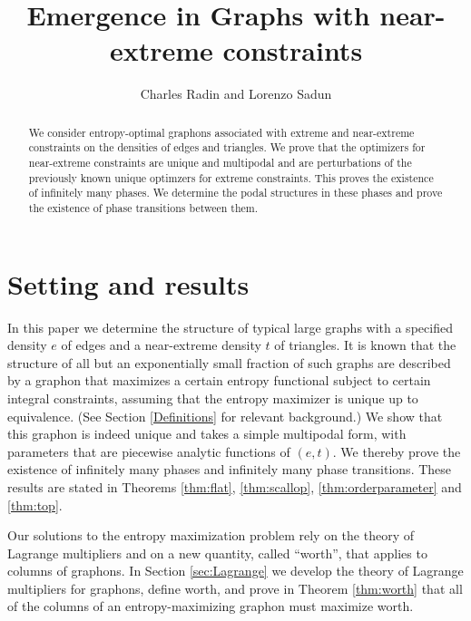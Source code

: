 \documentclass[12pt]{amsart}
\title{Emergence in Graphs with near-extreme constraints}
\author{Charles Radin and Lorenzo Sadun}
\newcommand{\Value}{worth}
\begin{document}
\begin{abstract} 
We consider entropy-optimal graphons associated with extreme and near-extreme constraints on the densities of edges and triangles. We prove that the optimizers for near-extreme constraints are unique and multipodal and are perturbations of the previously known unique optimzers for extreme constraints. This proves the existence of infinitely many phases. We determine the podal structures in these phases and prove the existence of phase transitions between them.
 \end{abstract} 
\maketitle

\section{Setting and results}

In this paper we determine the structure of typical
large graphs with a specified density $e$ of edges and 
a near-extreme density $t$ of triangles. It is known that
the structure of all but an exponentially small 
fraction of such graphs are described by a graphon that
maximizes a certain entropy functional subject to 
certain integral constraints, assuming that the entropy
maximizer is unique up to equivalence. (See Section \ref{Definitions} for relevant background.) We show that
this graphon is indeed unique and takes a simple multipodal form, with parameters that are piecewise analytic functions of 
$(e,t)$. We thereby prove the existence of infinitely many phases and infinitely many phase 
transitions. These results are stated in Theorems \ref{thm:flat}, 
\ref{thm:scallop}, \ref{thm:orderparameter} and \ref{thm:top}.

Our solutions to the entropy maximization problem rely
on the theory of Lagrange multipliers and on a new
quantity, called ``\Value'', that applies to 
columns of graphons. In Section \ref{sec:Lagrange} we 
develop the theory of Lagrange multipliers for 
graphons, define \Value, and prove in Theorem 
\ref{thm:worth} that all of the columns of 
an entropy-maximizing graphon must maximize \Value.
\end{document}
